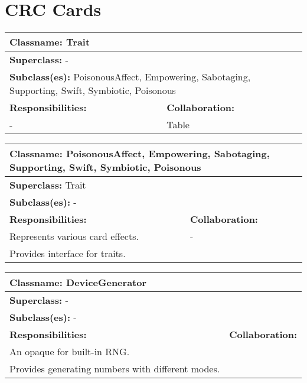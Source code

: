 \documentclass[CCGS.tex]{subfiles}
\begin{document}
\section{CRC Cards} 
\begin{table}[H]
    \centering
    \begin{tabular}{|l|l|}
         \toprule
         \multicolumn{2}{|l|}{\textbf{Classname: }Trait} \\
         \midrule
         \multicolumn{2}{|l|}{\textbf{Superclass: }-} \\
         \multicolumn{2}{|l|}{\textbf{Subclass(es): }PoisonousAffect, Empowering, Sabotaging, Supporting, Swift, Symbiotic, Poisonous} \\
         \midrule
         \textbf{Responsibilities:} & \textbf{Collaboration:} \\
         - & Table  \\ 
         \bottomrule
    \end{tabular}
    \label{tab:my_label}
\end{table}

\begin{table}[H]
    \centering
    \begin{tabular}{|l|l|}
         \toprule
         \multicolumn{2}{|l|}{\textbf{Classname: }PoisonousAffect, Empowering, Sabotaging, Supporting, Swift, Symbiotic, Poisonous} \\
         \midrule
         \multicolumn{2}{|l|}{\textbf{Superclass: }Trait} \\
         \multicolumn{2}{|l|}{\textbf{Subclass(es): }-} \\
         \midrule
         \textbf{Responsibilities:} & \textbf{Collaboration:} \\
         Represents various card effects. & - \\
         Provides interface for traits. & \\
         \bottomrule
    \end{tabular}
    \label{tab:my_label}
\end{table}

\begin{table}[H]
    \centering
    \begin{tabular}{|l|l|}
         \toprule
         \multicolumn{2}{|l|}{\textbf{Classname: }DeviceGenerator} \\
         \midrule
         \multicolumn{2}{|l|}{\textbf{Superclass: }-} \\
         \multicolumn{2}{|l|}{\textbf{Subclass(es): }-} \\
         \midrule
         \textbf{Responsibilities:} & \textbf{Collaboration:} \\
         An opaque for built-in RNG.&  \\ 
         Provides generating numbers with different modes. &  \\ 
         \bottomrule
    \end{tabular}
    \label{tab:my_label}
\end{table}
\end{document}
